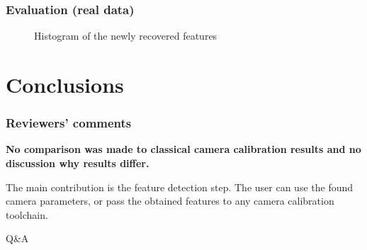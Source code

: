\documentclass{beamer}
\begin{document}
\begin{frame}
	\frametitle{Evaluation (real data)}

	\begin{figure}[h!]
		\caption{Histogram of the newly recovered features}
		\label{fig:recovered_points_histogram}
	\end{figure}

\end{frame}

\section{Conclusions}\label{sec:conclusions}

\begin{frame}
	\frametitle{Reviewers' comments}

	\textbf{No comparison was made to classical camera calibration results and no
		discussion why results differ.}

	The main contribution is the feature detection step. The user can use the
	found camera parameters, or pass the obtained features to any camera
	calibration toolchain.
\end{frame}

\begin{frame}[standout]
	Q\&A

\end{frame}

\appendix
\end{document}
